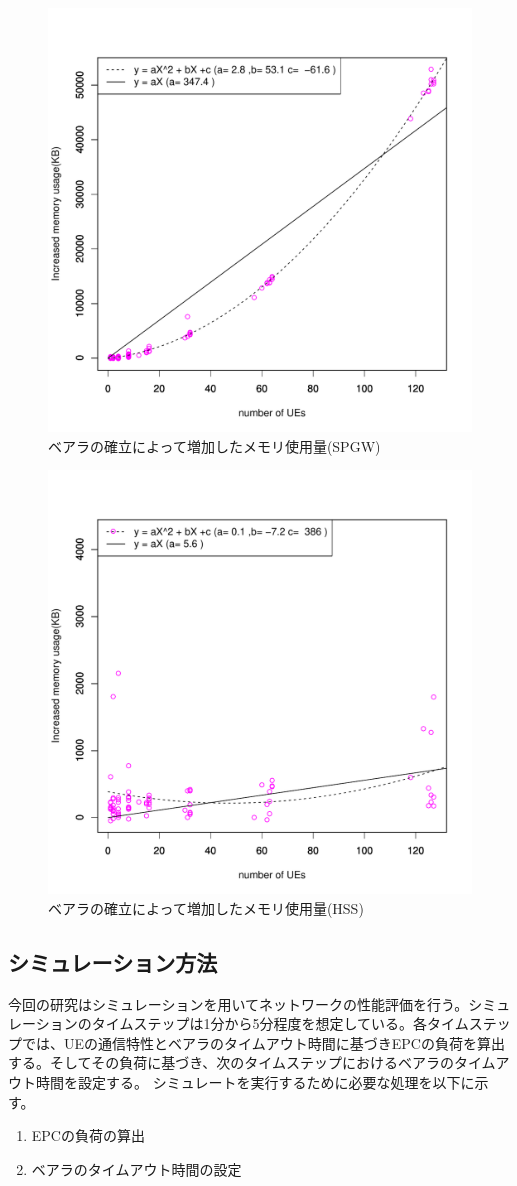 \documentclass[a4j]{ujarticle}
\begin{document}
\begin{figure}[htbp]
	\centering
	\includegraphics[width=0.7\hsize]{spgw_memory.pdf}
  \caption{ベアラの確立によって増加したメモリ使用量(SPGW)}
	\label{spgw_memory}
\end{figure}

\begin{figure}[htbp]
	\centering
	\includegraphics[width=0.7\hsize]{hss_memory.pdf}
  \caption{ベアラの確立によって増加したメモリ使用量(HSS)}
	\label{hss_memory}
\end{figure}

\clearpage
\subsection{シミュレーション方法}
今回の研究はシミュレーションを用いてネットワークの性能評価を行う。シミュレーションのタイムステップは1分から5分程度を想定している。各タイムステップでは、UEの通信特性とベアラのタイムアウト時間に基づきEPCの負荷を算出する。そしてその負荷に基づき、次のタイムステップにおけるベアラのタイムアウト時間を設定する。
シミュレートを実行するために必要な処理を以下に示す。
\begin{enumerate}
	\item EPCの負荷の算出
  \item ベアラのタイムアウト時間の設定
\end{enumerate}
\end{document}

